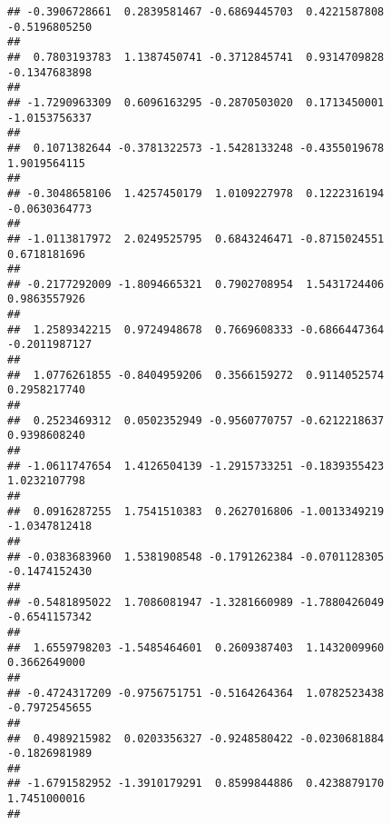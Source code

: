 \documentclass[]{article}
\begin{document}
\begin{verbatim}
## -0.3906728661  0.2839581467 -0.6869445703  0.4221587808 -0.5196805250 
##                                                                       
##  0.7803193783  1.1387450741 -0.3712845741  0.9314709828 -0.1347683898 
##                                                                       
## -1.7290963309  0.6096163295 -0.2870503020  0.1713450001 -1.0153756337 
##                                                                       
##  0.1071382644 -0.3781322573 -1.5428133248 -0.4355019678  1.9019564115 
##                                                                       
## -0.3048658106  1.4257450179  1.0109227978  0.1222316194 -0.0630364773 
##                                                                       
## -1.0113817972  2.0249525795  0.6843246471 -0.8715024551  0.6718181696 
##                                                                       
## -0.2177292009 -1.8094665321  0.7902708954  1.5431724406  0.9863557926 
##                                                                       
##  1.2589342215  0.9724948678  0.7669608333 -0.6866447364 -0.2011987127 
##                                                                       
##  1.0776261855 -0.8404959206  0.3566159272  0.9114052574  0.2958217740 
##                                                                       
##  0.2523469312  0.0502352949 -0.9560770757 -0.6212218637  0.9398608240 
##                                                                       
## -1.0611747654  1.4126504139 -1.2915733251 -0.1839355423  1.0232107798 
##                                                                       
##  0.0916287255  1.7541510383  0.2627016806 -1.0013349219 -1.0347812418 
##                                                                       
## -0.0383683960  1.5381908548 -0.1791262384 -0.0701128305 -0.1474152430 
##                                                                       
## -0.5481895022  1.7086081947 -1.3281660989 -1.7880426049 -0.6541157342 
##                                                                       
##  1.6559798203 -1.5485464601  0.2609387403  1.1432009960  0.3662649000 
##                                                                       
## -0.4724317209 -0.9756751751 -0.5164264364  1.0782523438 -0.7972545655 
##                                                                       
##  0.4989215982  0.0203356327 -0.9248580422 -0.0230681884 -0.1826981989 
##                                                                       
## -1.6791582952 -1.3910179291  0.8599844886  0.4238879170  1.7451000016 
##                                                                       

\end{verbatim}
\end{document}
